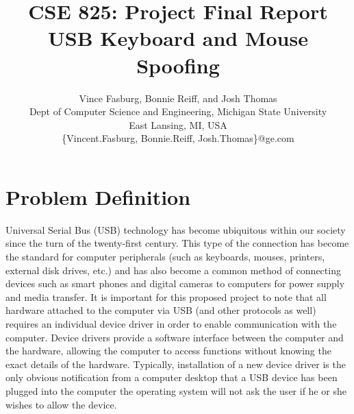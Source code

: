 \documentclass[pagenumbers]{ieee}
\begin{document}
\title{CSE 825: Project Final Report \\
USB Keyboard and Mouse Spoofing\\
}

\author{Vince Fasburg, Bonnie Reiff, and Josh Thomas\\
Dept of Computer Science and Engineering, Michigan State University\\
East Lansing, MI, USA\\
\{Vincent.Fasburg, Bonnie.Reiff, Josh.Thomas\}@ge.com\\
}

\maketitle
\thispagestyle{empty}

\section{Problem Definition}

Universal Serial Bus (USB) technology has become ubiquitous within our society since the turn of the twenty-first century. This type of the connection has become the standard for computer peripherals (such as keyboards, mouses, printers, external disk drives, etc.) and has also become a common method of connecting devices such as smart phones and digital cameras to computers for power supply and media transfer. It is important for this proposed project to note that all hardware attached to the computer via USB (and other protocols as well) requires an individual device driver in order to enable communication with the computer. Device drivers provide a software interface between the computer and the hardware, allowing the computer to access functions without knowing the exact details of the hardware. Typically, installation of a new device driver is the only obvious notification from a computer desktop that a USB device has been plugged into the computer \textemdash{} the operating system will not ask the user if he or she wishes to allow the device.
\end{document}
